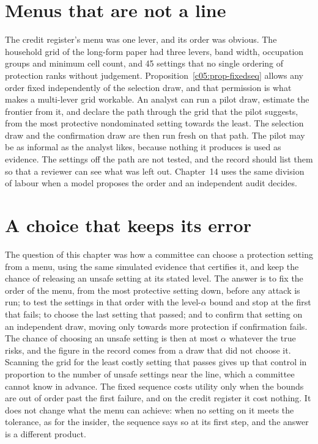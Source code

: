 \section{Menus that are not a line}

The credit register's menu was one lever, and its order was obvious. The household
grid of the long-form paper had three levers, band width, occupation groups and minimum
cell count, and 45 settings that no single ordering of protection ranks without
judgement. Proposition~\ref{c05:prop-fixedseq} allows any order fixed independently of
the selection draw, and that permission is what makes a multi-lever grid workable. An
analyst can run a pilot draw, estimate the frontier from it, and declare the path through
the grid that the pilot suggests, from the most protective nondominated setting towards
the least. The selection draw and the confirmation draw are then run fresh on that path.
The pilot may be as informal as the analyst likes, because nothing it produces is used as
evidence. The settings off the path are not tested, and the record should list them so
that a reviewer can see what was left out. Chapter~14 uses the same division of labour
when a model proposes the order and an independent audit decides.

\section{A choice that keeps its error}

The question of this chapter was how a committee can choose a protection setting from a
menu, using the same simulated evidence that certifies it, and keep the chance of
releasing an unsafe setting at its stated level. The answer is to fix the order of the
menu, from the most protective setting down, before any attack is run; to test the
settings in that order with the level-$\alpha$ bound and stop at the first that fails; to
choose the last setting that passed; and to confirm that setting on an independent draw,
moving only towards more protection if confirmation fails. The chance of choosing an
unsafe setting is then at most $\alpha$ whatever the true risks, and the figure in the
record comes from a draw that did not choose it. Scanning the grid for the least costly
setting that passes gives up that control in proportion to the number of unsafe settings
near the line, which a committee cannot know in advance. The fixed sequence costs utility
only when the bounds are out of order past the first failure, and on the credit register
it cost nothing. It does not change what the menu can achieve: when no setting on it
meets the tolerance, as for the insider, the sequence says so at its first step, and the
answer is a different product.

